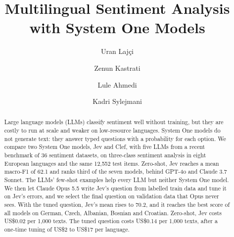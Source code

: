 \documentclass[sigconf]{acmart}
\begin{document}
\title{Multilingual Sentiment Analysis with System One Models}

\author{Uran Laj\c{c}i}

\author{Zenun Kastrati}

\author{Lule Ahmedi}

\author{Kadri Sylejmani}

\renewcommand{\shortauthors}{Laj\c{c}i et al.}

\begin{abstract}
Large language models (LLMs) classify sentiment well without training, but they are costly to run at scale and weaker on low-resource languages. System One models do not generate text: they answer typed questions with a probability for each option. We compare two System One models, Jev and Clef, with five LLMs from a recent benchmark of 36 sentiment datasets, on three-class sentiment analysis in eight European languages and the same 12,552 test items. Zero-shot, Jev reaches a mean macro-F1 of 62.1 and ranks third of the seven models, behind GPT-4o and Claude 3.7 Sonnet. The LLMs' few-shot examples help every LLM but neither System One model. We then let Claude Opus 5.5 write Jev's question from labelled train data and tune it on Jev's errors, and we select the final question on validation data that Opus never sees. With the tuned question, Jev's mean rises to 70.2, and it reaches the best score of all models on German, Czech, Albanian, Bosnian and Croatian. Zero-shot, Jev costs US\$0.02 per 1,000 texts. The tuned question costs US\$0.14 per 1,000 texts, after a one-time tuning of US\$2 to US\$17 per language.
\end{abstract}
\end{document}
